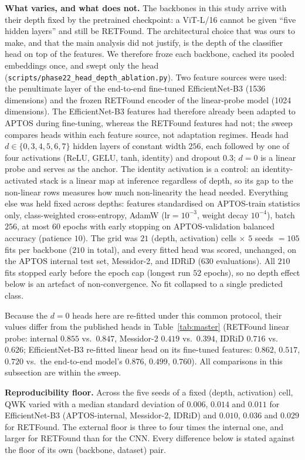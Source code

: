 \documentclass[journal]{IEEEtran}
\begin{document}
\textbf{What varies, and what does not.} The backbones in this study arrive with
their depth fixed by the pretrained checkpoint: a ViT-L/16 cannot be given
``five hidden layers'' and still be RETFound. The architectural choice that was
ours to make, and that the main analysis did not justify, is the depth of the
classifier head on top of the features. We therefore froze each backbone, cached
its pooled embeddings once, and swept only the head
(\texttt{scripts/}\allowbreak\texttt{phase22\_head\_depth\_ablation.py}). Two feature sources were
used: the penultimate layer of the end-to-end fine-tuned EfficientNet-B3
(1536 dimensions) and the frozen RETFound encoder of the linear-probe model (1024 dimensions).
The EfficientNet-B3 features had therefore already been adapted to APTOS during
fine-tuning, whereas the RETFound features had not; the sweep compares heads
within each feature source, not adaptation regimes. Heads had
$d\in\{0,3,4,5,6,7\}$ hidden layers of constant width $256$, each followed by one
of four activations (ReLU, GELU, tanh, identity) and dropout $0.3$; $d=0$ is a
linear probe and serves as the anchor. The identity activation is a control: an
identity-activated stack is a linear map at inference regardless of depth, so its
gap to the non-linear rows measures how much non-linearity the head needed.
Everything else was held fixed across depths: features standardised on APTOS-train
statistics only, class-weighted cross-entropy, AdamW ($\text{lr}=10^{-3}$, weight
decay $10^{-4}$), batch $256$, at most $60$ epochs with early stopping on
APTOS-validation balanced accuracy (patience $10$). The grid was
$21$ (depth, activation) cells $\times$ $5$ seeds $=105$ fits per backbone
($210$ in total), and every fitted head was scored, unchanged, on the APTOS
internal test set, Messidor-2, and IDRiD ($630$ evaluations). All $210$ fits
stopped early before the epoch cap (longest run $52$ epochs), so no depth effect
below is an artefact of non-convergence. No fit collapsed to a single predicted
class.

Because the $d=0$ heads here are re-fitted under this common protocol, their
values differ from the published heads in Table~\ref{tab:master} (RETFound linear
probe: internal $0.855$ vs.\ $0.847$, Messidor-2 $0.419$ vs.\ $0.394$, IDRiD
$0.716$ vs.\ $0.626$; EfficientNet-B3 re-fitted linear head on its fine-tuned
features: $0.862$, $0.517$, $0.720$ vs.\ the end-to-end model's $0.876$,
$0.499$, $0.760$). All comparisons in this subsection are within the sweep.

\textbf{Reproducibility floor.} Across the five seeds of a fixed (depth,
activation) cell, QWK varied with a median standard deviation of $0.006$, $0.014$
and $0.011$ for EfficientNet-B3 (APTOS-internal, Messidor-2, IDRiD) and $0.010$,
$0.036$ and $0.029$ for RETFound. The external floor is three to four times the
internal one, and larger for RETFound than for the CNN. Every difference below is
stated against the floor of its own (backbone, dataset) pair.
\end{document}
